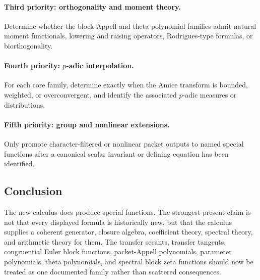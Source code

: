 \paragraph{Third priority: orthogonality and moment theory.}
Determine whether the block-Appell and theta polynomial families admit natural moment functionals, lowering and raising operators, Rodrigues-type formulas, or biorthogonality.

\paragraph{Fourth priority: $p$-adic interpolation.}
For each core family, determine exactly when the Amice transform is bounded, weighted, or overconvergent, and identify the associated $p$-adic measures or distributions.

\paragraph{Fifth priority: group and nonlinear extensions.}
Only promote character-filtered or nonlinear packet outputs to named special functions after a canonical scalar invariant or defining equation has been identified.

\subsection*{Conclusion}

The new calculus does produce special functions.  The strongest present claim is not that every displayed formula is historically new, but that the calculus supplies a coherent generator, closure algebra, coefficient theory, spectral theory, and arithmetic theory for them.  The transfer secants, transfer tangents, congruential Euler block functions, packet-Appell polynomials, parameter polynomials, theta polynomials, and spectral block zeta functions should now be treated as one documented family rather than scattered consequences.

